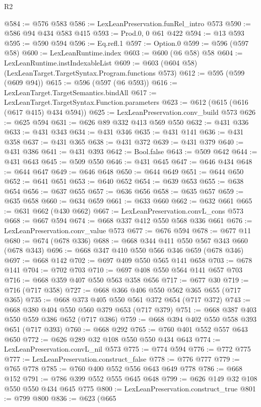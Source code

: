 \begin{lexlean}{R2}
\begin{coremodule}
@584 := @576 @583
@586 := LexLeanPreservation.funRel_intro @573
@590 := @586 @94 @434 @583 @415
@593 := Prod.{0, 0} @61 @422
@594 := @13 @593
@595 := @590 @594
@596 := Eq.refl.{1}
@597 := Option.{0}
@599 := @596 (@597 @58)
@600 := LexLeanRuntime.index
@603 := @600 (@6 @58) @58
@604 := LexLeanRuntime.instIndexableList
@609 := @603 (@604 @58) (LexLeanTarget.TargetSyntax.Program.functions @573)
@612 := @595 (@599 (@609 @94))
@615 := @596 (@597 (@6 @593))
@616 := LexLeanTarget.TargetSemantics.bindAll
@617 := LexLeanTarget.TargetSyntax.Function.parameters
@623 := @612 (@615 (@616 (@617 @415) @434 @594))
@625 := LexLeanPreservation.conv_build @573
@626 := @625 @594
@631 := @626 @89 @332 @413 @569 @550
@632 := @431 @336
@633 := @431 @343
@634 := @431 @346
@635 := @431 @141
@636 := @431 @358
@637 := @431 @365
@638 := @431 @372
@639 := @431 @379
@640 := @431 @386
@641 := @431 @393
@642 := Bool.false
@643 := @509 @642
@644 := @431 @643
@645 := @509 @550
@646 := @431 @645
@647 := @646 @434
@648 := @644 @647
@649 := @646 @648
@650 := @644 @649
@651 := @644 @650
@652 := @641 @651
@653 := @640 @652
@654 := @639 @653
@655 := @638 @654
@656 := @637 @655
@657 := @636 @656
@658 := @635 @657
@659 := @635 @658
@660 := @634 @659
@661 := @633 @660
@662 := @632 @661
@665 := @631 @662 (@430 @662)
@667 := LexLeanPreservation.convL_cons @573
@668 := @667 @594
@674 := @668 @337 @412 @550 @568 @336 @661
@676 := LexLeanPreservation.conv_value @573
@677 := @676 @594
@678 := @677 @11
@680 := @674 (@678 @336)
@688 := @668 @344 @411 @550 @567 @343 @660 (@678 @343)
@696 := @668 @347 @410 @550 @566 @346 @659 (@678 @346)
@697 := @668 @142
@702 := @697 @409 @550 @565 @141 @658
@703 := @678 @141
@704 := @702 @703
@710 := @697 @408 @550 @564 @141 @657 @703
@716 := @668 @359 @407 @550 @563 @358 @656
@717 := @677 @30
@719 := @716 (@717 @358)
@727 := @668 @366 @406 @550 @562 @365 @655 (@717 @365)
@735 := @668 @373 @405 @550 @561 @372 @654 (@717 @372)
@743 := @668 @380 @404 @550 @560 @379 @653 (@717 @379)
@751 := @668 @387 @403 @550 @559 @386 @652 (@717 @386)
@759 := @668 @394 @402 @550 @558 @393 @651 (@717 @393)
@760 := @668 @292
@765 := @760 @401 @552 @557 @643 @650
@772 := @626 @289 @32 @108 @550 @550 @434 @643
@774 := LexLeanPreservation.convL_nil @573
@775 := @774 @594
@776 := @772 @775
@777 := LexLeanPreservation.construct_false
@778 := @776 @777
@779 := @765 @778
@785 := @760 @400 @552 @556 @643 @649 @778
@786 := @668 @152
@791 := @786 @399 @552 @555 @645 @648
@799 := @626 @149 @32 @108 @550 @550 @434 @645 @775
@800 := LexLeanPreservation.construct_true
@801 := @799 @800
@836 := @623
    (@665

\end{coremodule}
\end{lexlean}
